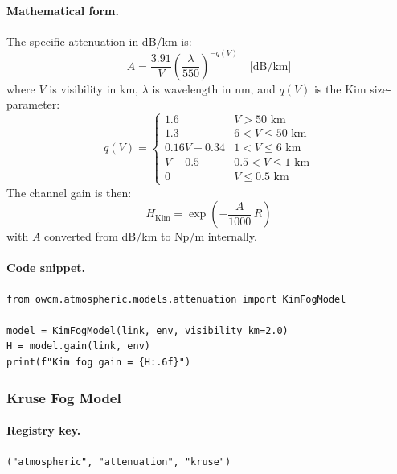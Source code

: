 \documentclass[11pt,a4paper]{article}
\begin{document}
\paragraph{Mathematical form.}
The specific attenuation in dB/km is:
\begin{equation}
A = \frac{3.91}{V} \left(\frac{\lambda}{550}\right)^{-q(V)}
\quad \text{[dB/km]}
\end{equation}
where $V$ is visibility in km, $\lambda$ is wavelength in nm, and $q(V)$ is
the Kim size-parameter:
\begin{equation}
q(V) =
\begin{cases}
1.6     & V > 50\text{ km} \\
1.3     & 6 < V \le 50\text{ km} \\
0.16V + 0.34 & 1 < V \le 6\text{ km} \\
V - 0.5 & 0.5 < V \le 1\text{ km} \\
0       & V \le 0.5\text{ km}
\end{cases}
\end{equation}
The channel gain is then:
\begin{equation}
\boxed{H_{\text{Kim}} = \exp\!\left(-\frac{A}{1000}\,R\right)}
\end{equation}
with $A$ converted from dB/km to Np/m internally.

\paragraph{Code snippet.}
\begin{lstlisting}
from owcm.atmospheric.models.attenuation import KimFogModel

model = KimFogModel(link, env, visibility_km=2.0)
H = model.gain(link, env)
print(f"Kim fog gain = {H:.6f}")
\end{lstlisting}

\subsubsection{Kruse Fog Model}
\label{sec:kruse}

\paragraph{Registry key.} \texttt{("atmospheric", "attenuation", "kruse")}
\end{document}
